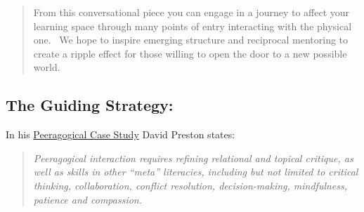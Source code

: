 
\begin{quote}
From this conversational piece you can engage in a journey to affect
your learning space through many points of entry interacting with the
physical one.~ We hope to inspire emerging structure and reciprocal
mentoring to create a ripple effect for those willing to open the door
to a new possible world.
\end{quote}

\subsection{The Guiding Strategy:}

In his \href{http://peeragogy.org/case-study-5ph1nx/}{Peeragogical Case
Study} David Preston states:

\begin{quote}
\emph{Peeragogical interaction requires refining relational and topical
critique, as well as skills in other ``meta'' literacies, including but
not limited to critical thinking, collaboration, conflict resolution,
decision-making, mindfulness, patience and compassion.} 
\end{quote}

